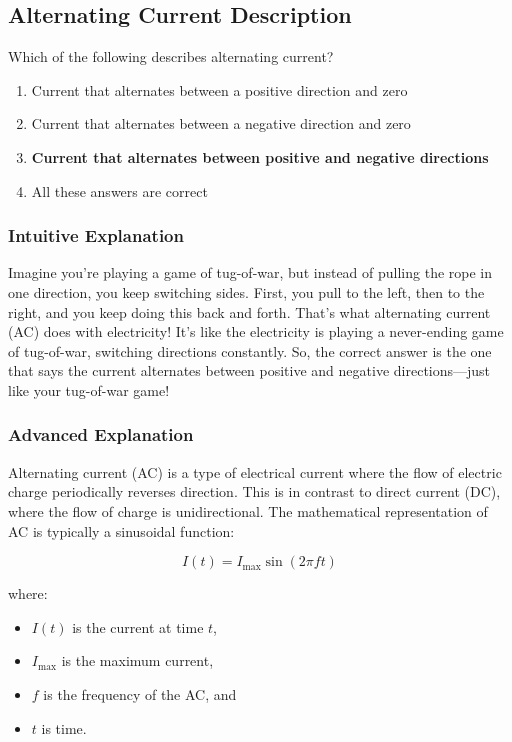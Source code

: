 \subsection{Alternating Current Description}
\label{T5A09}

\begin{tcolorbox}[colback=gray!10!white,colframe=black!75!black,title=T5A09]
Which of the following describes alternating current?
\begin{enumerate}[label=\Alph*]
    \item Current that alternates between a positive direction and zero
    \item Current that alternates between a negative direction and zero
    \item \textbf{Current that alternates between positive and negative directions}
    \item All these answers are correct
\end{enumerate}
\end{tcolorbox}

\subsubsection{Intuitive Explanation}
Imagine you’re playing a game of tug-of-war, but instead of pulling the rope in one direction, you keep switching sides. First, you pull to the left, then to the right, and you keep doing this back and forth. That’s what alternating current (AC) does with electricity! It’s like the electricity is playing a never-ending game of tug-of-war, switching directions constantly. So, the correct answer is the one that says the current alternates between positive and negative directions—just like your tug-of-war game!

\subsubsection{Advanced Explanation}
Alternating current (AC) is a type of electrical current where the flow of electric charge periodically reverses direction. This is in contrast to direct current (DC), where the flow of charge is unidirectional. The mathematical representation of AC is typically a sinusoidal function:

\[
I(t) = I_{\text{max}} \sin(2\pi ft)
\]

where:
\begin{itemize}
    \item \( I(t) \) is the current at time \( t \),
    \item \( I_{\text{max}} \) is the maximum current,
    \item \( f \) is the frequency of the AC, and
    \item \( t \) is time.
\end{itemize}

